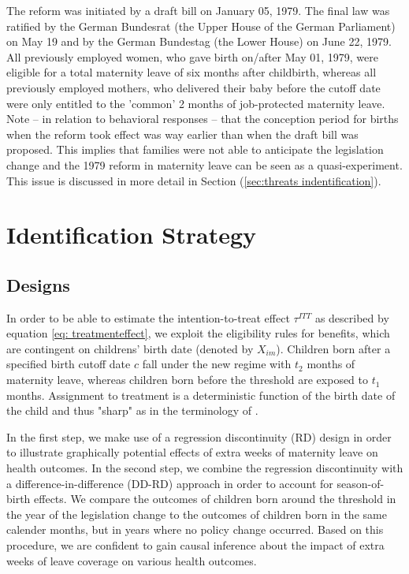 \documentclass[a4paper ]{article}
\begin{document}
The reform was initiated by a draft bill on January 05, 1979. The final law was ratified by the German Bundesrat (the Upper House of the German Parliament) on May 19 and by the German Bundestag (the Lower House) on June 22, 1979.  All previously employed women, who gave birth on/after May 01, 1979, were eligible for a total maternity leave of six months after childbirth, whereas all previously employed mothers, who delivered their baby before the cutoff date were only entitled to the 'common' 2 months of job-protected maternity leave. Note -- in relation to behavioral responses -- that the conception period for births when the reform took effect was way earlier than when the draft bill was proposed. This implies that families were not able to anticipate the legislation change and the 1979 reform in maternity leave can be seen as a quasi-experiment. This issue is discussed in more detail in Section (\ref{sec:threats indentification}).




\bigskip%
\section{Identification Strategy}\label{sec: ident.strategy}
\subsection{Designs}\label{sec: estimation strategies}


In order to be able to estimate the intention-to-treat effect $\tau^{ITT}$ as described by equation \ref{eq: treatmenteffect}, we exploit the eligibility rules for benefits, which are contingent on childrens' birth date (denoted by $X_{im}$). Children born after a specified birth cutoff date $c$ fall under the new regime with $t_2$ months of maternity leave, whereas children born before the threshold are exposed to $t_1$ months. Assignment to treatment is a deterministic function of the birth date of the child and thus "sharp" as in the terminology of \cite{hahn2001identification}.



 In the first step, we make use of a regression discontinuity (RD) design in order to illustrate graphically potential effects of extra weeks of maternity leave on health outcomes. In the second step, we combine the regression discontinuity with a difference-in-difference (DD-RD) approach in order to account for season-of-birth effects. We compare the outcomes of children born around the threshold in the year of the legislation change to the outcomes of children born in the same calender months, but in years where no policy change occurred. Based on this procedure, we are confident to gain causal inference about the impact of extra weeks of leave coverage on various health outcomes. \newline
\end{document}
